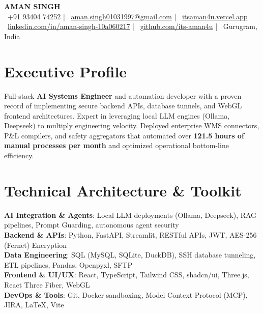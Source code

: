 \documentclass[letterpaper,10pt]{article}
\begin{document}
\begin{center}
    {\Huge \textbf{\color{primaryColor} AMAN SINGH}} \\ \vspace{6pt}
    \small
    \faPhone\ +91 93404 74252 \quad | \quad
    \faEnvelope\ \href{mailto:aman.singh01031997@gmail.com}{aman.singh01031997@gmail.com} \quad | \quad
    \faGlobe\ \href{https://itsaman4u.vercel.app}{itsaman4u.vercel.app} \\ \vspace{3pt}
    \faLinkedin\ \href{https://linkedin.com/in/aman-singh-10a060217}{linkedin.com/in/aman-singh-10a060217} \quad | \quad
    \faGithub\ \href{https://github.com/its-aman4u}{github.com/its-aman4u} \quad | \quad
    \faMapMarker*\ Gurugram, India
\end{center}

\section{Executive Profile}
Full-stack \textbf{AI Systems Engineer} and automation developer with a proven record of implementing secure backend APIs, database tunnels, and WebGL frontend architectures. Expert in leveraging local LLM engines (Ollama, Deepseek) to multiply engineering velocity. Deployed enterprise WMS connectors, P\&L compilers, and safety aggregators that automated over \textbf{121.5 hours of manual processes per month} and optimized operational bottom-line efficiency.

\section{Technical Architecture \& Toolkit}
\begin{itemize}[leftmargin=0.15in, label={}]
    \small{\item{
     \textbf{AI Integration \& Agents}{: Local LLM deployments (Ollama, Deepseek), RAG pipelines, Prompt Guarding, autonomous agent security} \\
     \textbf{Backend \& APIs}{: Python, FastAPI, Streamlit, RESTful APIs, JWT, AES-256 (Fernet) Encryption} \\
     \textbf{Data Engineering}{: SQL (MySQL, SQLite, DuckDB), SSH database tunneling, ETL pipelines, Pandas, Openpyxl, SFTP} \\
     \textbf{Frontend \& UI/UX}{: React, TypeScript, Tailwind CSS, shadcn/ui, Three.js, React Three Fiber, WebGL} \\
     \textbf{DevOps \& Tools}{: Git, Docker sandboxing, Model Context Protocol (MCP), JIRA, LaTeX, Vite}
    }}
\end{itemize}
\end{document}
